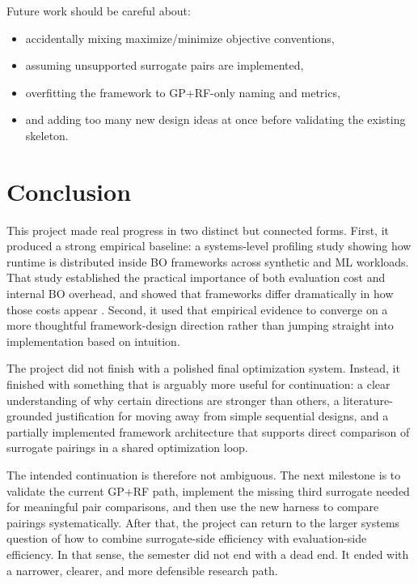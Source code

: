 \documentclass[11pt]{article}
\begin{document}
Future work should be careful about:
\begin{itemize}[leftmargin=1.5em]
    \item accidentally mixing maximize/minimize objective conventions,
    \item assuming unsupported surrogate pairs are implemented,
    \item overfitting the framework to GP+RF-only naming and metrics,
    \item and adding too many new design ideas at once before validating the existing skeleton.
\end{itemize}

\section{Conclusion}

This project made real progress in two distinct but connected forms. First, it produced a strong empirical baseline: a systems-level profiling study showing how runtime is distributed inside BO frameworks across synthetic and ML workloads. That study established the practical importance of both evaluation cost and internal BO overhead, and showed that frameworks differ dramatically in how those costs appear \cite{oumer2026baseline}. Second, it used that empirical evidence to converge on a more thoughtful framework-design direction rather than jumping straight into implementation based on intuition.

The project did not finish with a polished final optimization system. Instead, it finished with something that is arguably more useful for continuation: a clear understanding of why certain directions are stronger than others, a literature-grounded justification for moving away from simple sequential designs, and a partially implemented framework architecture that supports direct comparison of surrogate pairings in a shared optimization loop.

The intended continuation is therefore not ambiguous. The next milestone is to validate the current GP+RF path, implement the missing third surrogate needed for meaningful pair comparisons, and then use the new harness to compare pairings systematically. After that, the project can return to the larger systems question of how to combine surrogate-side efficiency with evaluation-side efficiency. In that sense, the semester did not end with a dead end. It ended with a narrower, clearer, and more defensible research path.



\end{document}
